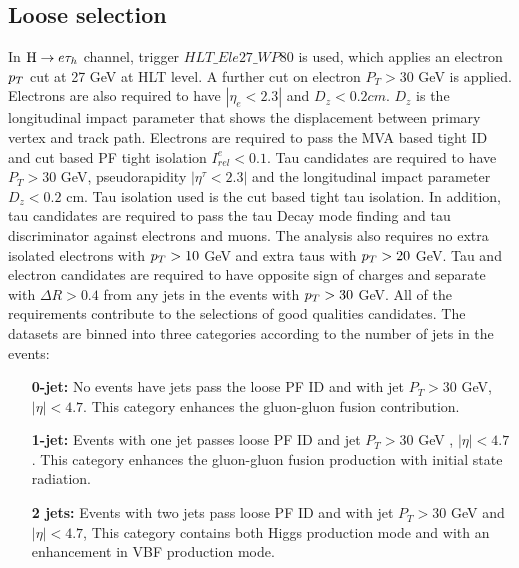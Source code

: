 \subsection{Loose selection}
In $ \mathrm{H} \to e \tau_{h}$ channel, trigger $HLT\_Ele27\_WP80$ is used, which applies an electron $p_{T}$ cut at 27 GeV at HLT level. A further cut on electron $P_{T}>30$ GeV is applied. Electrons are also required to have $|\eta_{e}<2.3|$ and $D_{z}<0.2 cm$. $D_{z}$ is the longitudinal impact parameter that shows the displacement between primary vertex and track path. Electrons are required to pass the MVA based tight ID and cut based PF tight isolation  $I_{rel}^{e}<0.1$. Tau candidates are required to have $P_{T}>30$ GeV, pseudorapidity $|\eta^{\tau}<2.3|$ and the longitudinal impact parameter $D_{z}<0.2$ cm. Tau isolation used is the cut based tight tau isolation. In addition, tau candidates are required to pass the tau Decay mode finding and tau discriminator against electrons and muons. The analysis also requires no extra isolated electrons with $p_{T}>10$ GeV and extra taus with $p_{T}>20$ GeV. Tau and electron candidates are required to have opposite sign of charges and separate with $\Delta R>0.4$ from any jets in the events with $p_{T}>30$ GeV. All of the requirements contribute to the selections of good qualities candidates. The datasets are binned into three categories according to the number of jets in the events:
\begin{enumerate}
\item[{\bf 0-jet:}] No events have jets pass the loose PF ID and  with jet $P_T>30$ GeV, $|\eta|<4.7$. This category enhances the gluon-gluon fusion contribution.
\item[{\bf 1-jet:}] Events with one jet passes loose PF ID and jet $P_T>30$ GeV , $|\eta|<4.7$. This category enhances the gluon-gluon fusion production with initial state radiation.
\item [{\bf 2 jets:}] Events with two jets pass loose PF ID and with jet $P_T>30$ GeV and $|\eta|<4.7$, This category contains both Higgs production mode and with an enhancement in VBF production mode. \end{enumerate}

